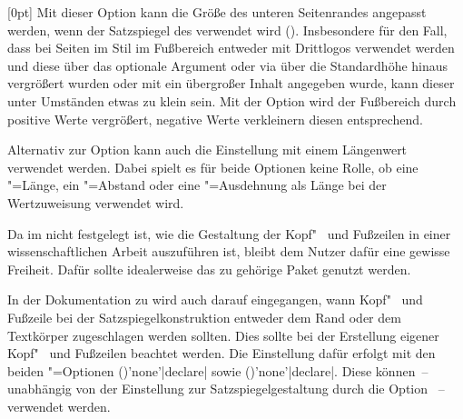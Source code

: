\begin{Declaration*}{}
\begin{Declaration*}{}
\begin{Declaration*}{}
\begin{Declaration}[v2.03]{}[0pt]%
\printdeclarationlist%
%
Mit dieser Option kann die Größe des unteren Seitenrandes angepasst werden, 
wenn der Satzspiegel des \CDs verwendet wird ().
Insbesondere für den Fall, dass bei Seiten im Stil  
im Fußbereich entweder mit  Drittlogos verwendet werden und 
diese über das optionale Argument oder via  über die 
Standardhöhe hinaus vergrößert wurden oder mit  ein 
übergroßer Inhalt angegeben wurde, kann dieser unter Umständen etwas zu klein 
sein. Mit der Option  wird der Fußbereich durch 
positive Werte vergrößert, negative Werte verkleinern diesen entsprechend. 

Alternativ zur Option  kann auch die Einstellung 
 mit einem Längenwert verwendet werden. 
Dabei spielt es für beide Optionen keine Rolle, ob eine "=Länge, 
ein "=Abstand oder eine "=Ausdehnung als Länge bei der 
Wertzuweisung verwendet wird.
\end{Declaration}

%
%
%
Da im \CD nicht festgelegt ist, wie die Gestaltung der Kopf"~ und Fußzeilen in 
einer wissenschaftlichen Arbeit auszuführen ist, bleibt dem Nutzer dafür eine 
gewisse Freiheit. Dafür sollte idealerweise das zu \KOMAScript{} gehörige Paket 
 genutzt werden. 

In der Dokumentation zu  wird auch darauf eingegangen, wann 
Kopf"~ und Fußzeile bei der Satzspiegelkonstruktion entweder dem Rand oder dem 
Textkörper zugeschlagen werden sollten. Dies sollte bei der Erstellung eigener 
Kopf"~ und Fußzeilen beachtet werden. Die Einstellung dafür erfolgt mit den 
beiden \KOMAScript"=Optionen 
()'none'|declare| sowie 
()'none'|declare|.
Diese können~-- unabhängig von der Einstellung zur Satzspiegelgestaltung durch 
die Option ~-- verwendet werden.


\end{Declaration*}
\end{Declaration*}
\end{Declaration*}
